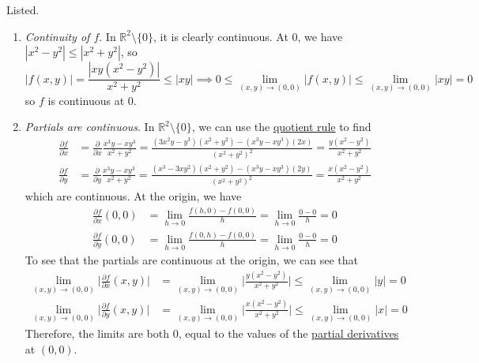 	\begin{solution}
	  Listed. 
		\begin{enumerate}
			\item \textit{Continuity of $f$}. In $\mathbb{R}^2 \setminus \{0\}$, it is clearly continuous. At $0$, we have $|x^2 - y^2| \leq |x^2 + y^2|$, so
				\begin{equation}
					|f(x, y)| = \frac{|xy (x^2 - y^2)|}{x^2 + y^2} \leq |xy| \implies 0 \leq \lim_{(x, y) \to (0, 0)} |f(x, y)|  \leq \lim_{(x, y) \to (0, 0)} |xy| = 0
				\end{equation}
				so $f$ is continuous at $0$. 
			\item \textit{Partials are continuous}. In $\mathbb{R}^2 \setminus \{0\}$, we can use the \hyperref[thm:quotient-rule]{quotient rule} to find 
				\begin{align}
					\frac{\partial f}{\partial x} & = \frac{\partial}{\partial x} \frac{x^3 y - xy^3}{x^2 + y^2} = \frac{(3x^2 y - y^3) (x^2 + y^2) - (x^3 y - x y^3)(2x)}{(x^2 + y^2)^2} = \frac{y (x^2 - y^2)}{x^2 + y^2} \\ 
					\frac{\partial f}{\partial y} & = \frac{\partial}{\partial y} \frac{x^3 y - xy^3}{x^2 + y^2} = \frac{(x^3 - 3xy^2) (x^2 + y^2) - (x^3 y - xy^3)(2y)}{(x^2 + y^2)^2} = \frac{x (x^2 - y^2)}{x^2 + y^2} 
				\end{align}
				which are continuous. At the origin, we have 
				\begin{align}
					\frac{\partial f}{\partial x} (0, 0) & = \lim_{h \to 0} \frac{f(h, 0) - f(0, 0)}{h} = \lim_{h \to 0} \frac{0 - 0}{h} = 0 \\ 
					\frac{\partial f}{\partial y} (0, 0) & = \lim_{h \to 0} \frac{f(0, h) - f(0, 0)}{h} = \lim_{h \to 0} \frac{0 - 0}{h} = 0 
				\end{align}
				To see that the partials are continuous at the origin, we can see that 
				\begin{align}
					\lim_{(x, y) \to (0, 0)} \bigg| \frac{\partial f}{\partial x} (x, y) \bigg| & = \lim_{(x, y) \to (0, 0)} \bigg| \frac{y (x^2 - y^2)}{x^2 + y^2} \bigg| \leq \lim_{(x, y) \to (0, 0)} |y| = 0 \\
					\lim_{(x, y) \to (0, 0)} \bigg| \frac{\partial f}{\partial y} (x, y) \bigg| & = \lim_{(x, y) \to (0, 0)} \bigg| \frac{x (x^2 - y^2)}{x^2 + y^2} \bigg| \leq \lim_{(x, y) \to (0, 0)} |x| = 0
				\end{align}
				Therefore, the limits are both $0$, equal to the values of the \hyperref[def:partial-derivative]{partial  derivatives} at $(0, 0)$. 


\end{enumerate}
\end{solution}
